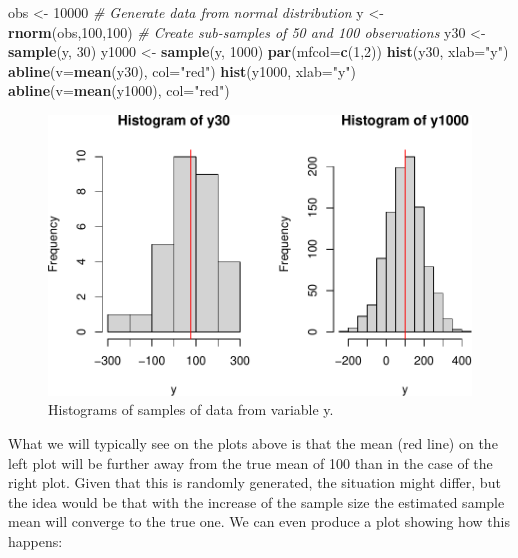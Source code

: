 \documentclass[
]{book}
\newenvironment{Shaded}{\begin{snugshade}}{\end{snugshade}}
\newcommand{\CommentTok}[1]{\textcolor[rgb]{0.56,0.35,0.01}{\textit{#1}}}
\newcommand{\DataTypeTok}[1]{\textcolor[rgb]{0.13,0.29,0.53}{#1}}
\newcommand{\DecValTok}[1]{\textcolor[rgb]{0.00,0.00,0.81}{#1}}
\newcommand{\KeywordTok}[1]{\textcolor[rgb]{0.13,0.29,0.53}{\textbf{#1}}}
\newcommand{\NormalTok}[1]{#1}
\newcommand{\StringTok}[1]{\textcolor[rgb]{0.31,0.60,0.02}{#1}}
\theoremstyle{definition}
\theoremstyle{definition}
\theoremstyle{definition}
\theoremstyle{definition}
\theoremstyle{remark}
\begin{document}
\begin{Shaded}
\begin{Highlighting}[]
\NormalTok{obs \textless{}{-}}\StringTok{ }\DecValTok{10000}
\CommentTok{\# Generate data from normal distribution}
\NormalTok{y \textless{}{-}}\StringTok{ }\KeywordTok{rnorm}\NormalTok{(obs,}\DecValTok{100}\NormalTok{,}\DecValTok{100}\NormalTok{)}
\CommentTok{\# Create sub{-}samples of 50 and 100 observations}
\NormalTok{y30 \textless{}{-}}\StringTok{ }\KeywordTok{sample}\NormalTok{(y, }\DecValTok{30}\NormalTok{)}
\NormalTok{y1000 \textless{}{-}}\StringTok{ }\KeywordTok{sample}\NormalTok{(y, }\DecValTok{1000}\NormalTok{)}
\KeywordTok{par}\NormalTok{(}\DataTypeTok{mfcol=}\KeywordTok{c}\NormalTok{(}\DecValTok{1}\NormalTok{,}\DecValTok{2}\NormalTok{))}
\KeywordTok{hist}\NormalTok{(y30, }\DataTypeTok{xlab=}\StringTok{"y"}\NormalTok{)}
\KeywordTok{abline}\NormalTok{(}\DataTypeTok{v=}\KeywordTok{mean}\NormalTok{(y30), }\DataTypeTok{col=}\StringTok{"red"}\NormalTok{)}
\KeywordTok{hist}\NormalTok{(y1000, }\DataTypeTok{xlab=}\StringTok{"y"}\NormalTok{)}
\KeywordTok{abline}\NormalTok{(}\DataTypeTok{v=}\KeywordTok{mean}\NormalTok{(y1000), }\DataTypeTok{col=}\StringTok{"red"}\NormalTok{)}
\end{Highlighting}
\end{Shaded}

\begin{figure}
\centering
\includegraphics{Svetunkov---Statistics-for-Business-Analytics_files/figure-latex/histY30Y1000-1.pdf}
\caption{\label{fig:histY30Y1000}Histograms of samples of data from variable y.}
\end{figure}

What we will typically see on the plots above is that the mean (red line) on the left plot will be further away from the true mean of 100 than in the case of the right plot. Given that this is randomly generated, the situation might differ, but the idea would be that with the increase of the sample size the estimated sample mean will converge to the true one. We can even produce a plot showing how this happens:
\end{document}
